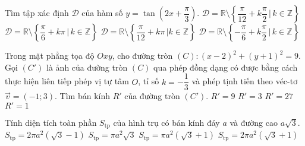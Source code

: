 \begin{ex}%
Tìm tập xác định $\mathscr{D}$ của hàm số $y = \tan\left(2x + \dfrac{\pi}{3}\right)$.
\choice
{\True $\mathscr{D} = \mathbb{R} \setminus \left\{\dfrac{\pi}{12} + k\dfrac{\pi}{2} \,\left| \,k \in \mathbb{Z}\right. \right\}$}
{$\mathscr{D} = \mathbb{R} \setminus \left\{\dfrac{\pi}{6} + k\pi \,\left| \,k \in \mathbb{Z}\right. \right\}$}
{$\mathscr{D} = \mathbb{R} \setminus \left\{\dfrac{\pi}{12} + k\pi \,\left|k\in \mathbb{Z}\right. \right\}$}
{$\mathscr{D} = \mathbb{R} \setminus \left\{-\dfrac{\pi}{6} + k\dfrac{\pi}{2} \,\left| \,k \in \mathbb{Z}\right. \right\}$}
\end{ex}

\begin{ex}%
Trong mặt phẳng tọa độ $Oxy$, cho đường tròn $(C): (x - 2)^2 + (y + 1)^2 = 9$. Gọi $(C')$ là ảnh của đường tròn $(C)$ qua phép đồng dạng có được bằng cách thực hiện liên tiếp phép vị tự tâm $O$, tỉ số $k = -\dfrac{1}{3}$ và phép tịnh tiến theo véc-tơ $\overrightarrow{v} = (-1;3)$. Tìm bán kính $R'$ của đường tròn $(C')$.
\choice
{$R' = 9$}
{$R' = 3$}
{$R' = 27$}
{\True $R' = 1$}
\end{ex}

\begin{ex}%
Tính diện tích toàn phần $S_{\mathrm{tp}}$ của hình trụ có bán kính đáy $a$ và đường cao $a\sqrt{3}$.
\choice
{$S_{\mathrm{tp}} = 2\pi a^2 \left(\sqrt{3}-1\right)$}
{$S_{\mathrm{tp}} = \pi a^2 \sqrt{3}$}
{$S_{\mathrm{tp}} = \pi a^2 \left(\sqrt{3}+1\right)$}
{\True $S_{\mathrm{tp}} = 2\pi a^2 \left(\sqrt{3}+1\right)$}
\end{ex}

